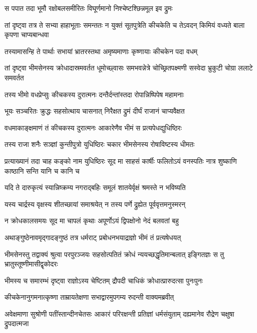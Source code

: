 \twolineshloka
{स पपात तदा भूमौ रक्षोबलसमीरितः}
{विघूर्णमानो निश्चेष्टश्छिन्नमूल इव द्रुमः}


\threelineshloka
{तां दृष्ट्वा तत्र ते सभ्या हाहाभूताः समन्ततः}
{न युक्तं सूतपुत्रेति कीचकेति च तेऽवदन्}
{किमियं वध्यते बाला कृपणा चाप्यबान्धवा}


\twolineshloka
{तस्यामासन्हि ते पार्थाः सभायां भ्रातरस्तथा}
{अमृष्यमाणाः कृष्णायाः कीचकेन पदा वधम्}


\threelineshloka
{तां दृष्ट्वा भीमसेनस्य क्रोधादास्रमवर्तत}
{धूमोच्छ्वासः समभवन्नेत्रे चोच्छ्रितपक्ष्मणी}
{सस्वेदा भ्रुकुटी चोग्रा ललाटे समवर्तत}


\twolineshloka
{तस्य भीमो वधप्रेप्सुः कीचकस्य दुरात्मनः}
{दन्तैर्दन्तांस्तदा रोपान्निष्पिपेष महामनाः}


\twolineshloka
{भूयः सञ्चरितः क्रुद्धः सहसोत्थाय चासनात्}
{निरैक्षत द्रुमं दीर्घं राजानं चाप्यवैक्षत}


\twolineshloka
{वधमाकाङ्क्षमाणं तं कीचकस्य दुरात्मनः}
{आकारेणैव भीमं स प्रत्यपेधद्युधिष्ठिरः}


\twolineshloka
{तस्य राजा शनैः सञ्ज्ञां कुन्तीपुत्रो युधिष्ठिरः}
{चकार भीमसेनस्य रोषाविष्टस्य धीमतः}


\onelineshloka
{प्रत्याख्यानं तदा चाह कङ्को नाम युधिष्ठिरः}
\twolineshloka
{सूद मा साहसं कार्षीः फलितोऽयं वनस्पतिः}
{नात्र शुष्काणि काष्ठानि सन्ति यानि च कानि च}


\twolineshloka
{यदि ते दारुकृत्यं स्यान्निष्क्रम्य नगराद्बहिः}
{समूलं शातयेर्वृक्षं श्रमस्ते न भविष्यति}


\twolineshloka
{यस्य चार्द्रस्य वृक्षस्य शीतच्छायां समाश्रयेत्}
{न तस्य पर्णे द्रुह्येत पूर्ववृत्तमनुस्मरन्}


\twolineshloka
{न क्रोधकालसमयः सूद मा चापलं कृथाः}
{अपूर्णोऽयं द्विपक्षोनो नेदं बलवतां बहु}


\twolineshloka
{अथाङ्गुष्ठेनावमृद्गादङ्गुष्ठं तत्र धर्मराट्}
{प्रबोधनभयाद्राज्ञो भीमं तं प्रत्यषेधयत्}


\threelineshloka
{भीमसेनस्तु तद्वाक्यं श्रुत्वा परपुरञ्जयः}
{सहसोत्पतितं क्रोधं न्ययच्छद्धृतिमान्बलात्}
{इङ्गितज्ञः स तु भ्रातुस्तूष्णीमासीद्वृकोदरः}


\twolineshloka
{भीमस्य च समारम्भं दृष्ट्वा राज्ञोऽस्य चेष्टितम्}
{द्रौपदी चाधिकं क्रोधात्प्रारुदत्सा पुनःपुनः}


\twolineshloka
{कीचकेनानुगमनात्कृष्णा ताम्रायतेक्षणा}
{सभाद्वारमुपगम्य रुदन्ती वाक्यमब्रवीत्}


\threelineshloka
{अवेक्षमाणा सुश्रोणी पतींस्तान्दीनचेतसः}
{आकारं परिरक्षन्ती प्रतिज्ञां धर्मसंयुताम्}
{दह्यमानेव रौद्रेण चक्षुषा द्रुपदात्मजा}


